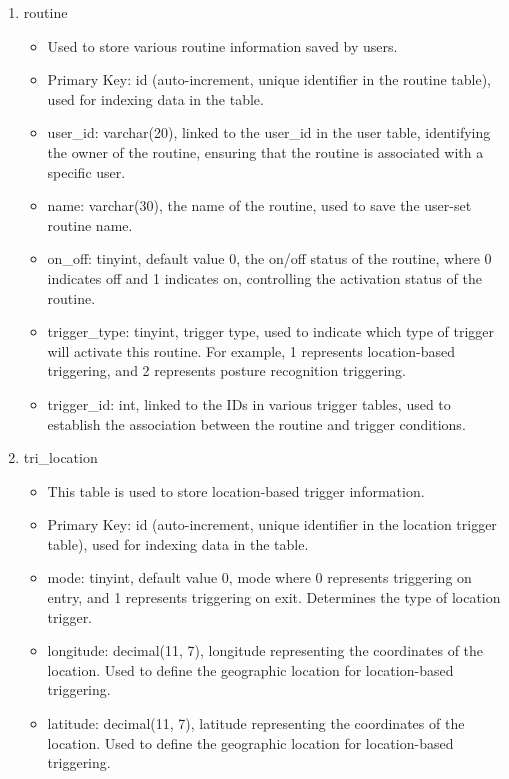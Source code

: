 \begin{enumerate}
\begin{enumerate}
              \item routine
                    \begin{itemize}
                        \item Used to store various routine information saved by users.
                        \item Primary Key: id (auto-increment, unique identifier in the routine table), used for indexing data in the table.
                        \item user\_id: varchar(20), linked to the user\_id in the user table, identifying the owner of the routine, ensuring that the routine is associated with a specific user.
                        \item name: varchar(30), the name of the routine, used to save the user-set routine name.
                        \item on\_off: tinyint, default value 0, the on/off status of the routine, where 0 indicates off and 1 indicates on, controlling the activation status of the routine.
                        \item trigger\_type: tinyint, trigger type, used to indicate which type of trigger will activate this routine. For example, 1 represents location-based triggering, and 2 represents posture recognition triggering.
                        \item trigger\_id: int, linked to the IDs in various trigger tables, used to establish the association between the routine and trigger conditions.\\
                    \end{itemize}

              \item tri\_location
                    \begin{itemize}
                        \item This table is used to store location-based trigger information.
                        \item Primary Key: id (auto-increment, unique identifier in the location trigger table), used for indexing data in the table.
                        \item mode: tinyint, default value 0, mode where 0 represents triggering on entry, and 1 represents triggering on exit. Determines the type of location trigger.
                        \item longitude: decimal(11, 7), longitude representing the coordinates of the location. Used to define the geographic location for location-based triggering.
                        \item latitude: decimal(11, 7), latitude representing the coordinates of the location. Used to define the geographic location for location-based triggering.\\
                    \end{itemize}


\end{enumerate}
\end{enumerate}
